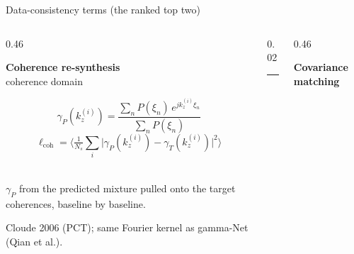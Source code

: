 \documentclass[aspectratio=169,9pt]{beamer}
\begin{document}
\begin{frame}{Data-consistency terms (the ranked top two)}
  \setlength{\abovedisplayskip}{3pt}
  \setlength{\belowdisplayskip}{3pt}
  \begin{columns}[T]
    \begin{column}{0.46\textwidth}
      \begin{minipage}[t][0.78\textheight][s]{\linewidth}
      \centering
      \textbf{Coherence re-synthesis}\\[1pt]
      {\footnotesize\color{soft} coherence domain}
      \par\vfill
      \[
        \gamma_P(k_z^{(i)}) = \frac{\sum_n P(\xi_n)\, e^{j k_z^{(i)} \xi_n}}{\sum_n P(\xi_n)}
      \]
      \[
        \ell_{\text{coh}} = \Big\langle \tfrac{1}{N_s}\textstyle\sum_i
          \big| \gamma_P(k_z^{(i)}) - \gamma_T(k_z^{(i)}) \big|^2 \Big\rangle
      \]
      \par\vfill
      \\[4pt]
      {\scriptsize \textcolor{accent}{$\gamma_P$ from the predicted mixture} pulled onto
       \textcolor{good}{the target coherences}, baseline by baseline.}
      \par\vfill
      {\footnotesize Cloude 2006 (PCT); same Fourier kernel as gamma-Net (Qian et al.).}
      \end{minipage}
    \end{column}
    \begin{column}{0.02\textwidth}
      \centering
      \textcolor{soft!40}{\rule{0.4pt}{0.74\textheight}}
    \end{column}
    \begin{column}{0.46\textwidth}
      \begin{minipage}[t][0.78\textheight][s]{\linewidth}
      \centering
      \textbf{Covariance matching}\\[1pt]

\end{minipage}
\end{column}
\end{columns}
\end{frame}
\end{document}
